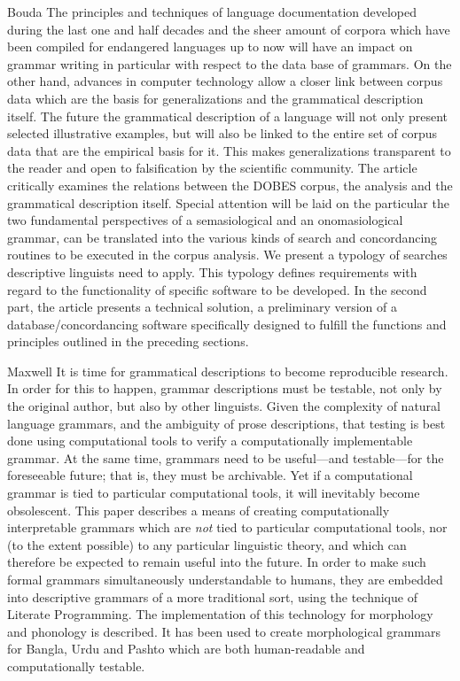 Bouda
The principles and techniques of language documentation developed during the last one and half decades and the sheer amount of corpora which have been compiled for endangered languages up to now will have an impact on grammar writing in particular with respect to the data base of grammars.  On the other hand, advances in computer technology allow a closer link between corpus data which are the basis for generalizations and the grammatical description itself. The future the grammatical description of a language will not only present selected illustrative examples, but will also be linked to the entire set of corpus data that are the empirical basis for it. This makes generalizations transparent to the reader and open to falsification by the scientific community.
The article critically examines the relations between the DOBES corpus, the analysis and the grammatical description itself. Special attention will be laid on the   particular the two fundamental perspectives of a semasiological and an onomasiological grammar, can be translated into the various kinds of search and concordancing routines to be executed in the corpus analysis. We present a typology of searches descriptive linguists need to apply. This typology defines requirements with regard to the functionality of specific software to be developed.
In the second part, the article presents a technical solution, a preliminary version of a database/concordancing software specifically designed to fulfill the functions and principles outlined in the preceding sections.

Maxwell
It is time for grammatical descriptions to become reproducible research. In order for this to happen, grammar descriptions must be testable, not only by the original author, but also by other linguists. Given the complexity of natural language grammars, and the ambiguity of prose descriptions, that testing is best done using computational tools to verify a computationally implementable grammar. At the same time, grammars need to be useful---and testable---for the foreseeable future; that is, they must be archivable. Yet if a computational grammar is tied to particular computational tools, it will inevitably become obsolescent. This paper describes a means of creating computationally interpretable grammars which are \textit{not }tied to particular computational tools, nor (to the extent possible) to any particular linguistic theory, and which can therefore be expected to remain useful into the future. In order to make such formal grammars simultaneously understandable to humans, they are embedded into descriptive grammars of a more traditional sort, using the technique of Literate Programming. The implementation of this technology for morphology and phonology is described. It has been used to create morphological grammars for Bangla, Urdu and Pashto which are both human-readable and computationally testable.

